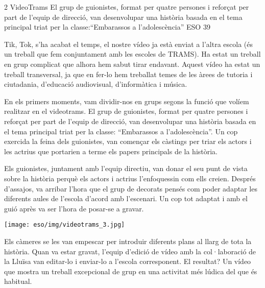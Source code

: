 \begin{news}
{2} %
{VideoTrams}
{El grup de guionistes, format per quatre persones i reforçat per part de l'equip de direcció, van desenvolupar una història basada en el tema principal triat per la classe:“Embarassos a l'adolescència” }
{ESO}
{39} %


Tik, Tok, s'ha acabat el temps, el nostre vídeo ja està enviat a l'altra escola (és un treball que fem conjuntament amb les escoles de TRAMS). Ha estat un treball en grup complicat que alhora hem sabut tirar endavant. Aquest vídeo ha estat un treball transversal, ja que en fer-lo  hem treballat temes de les àrees de tutoria i ciutadania, d'educació audiovisual, d'informàtica i música. 

En els primers moments,  vam dividir-nos en grups segons la funció que volíem realitzar en el videotrams. El grup de guionistes, format per quatre persones i reforçat per part de l'equip de direcció, van desenvolupar una història basada en el tema principal triat per la classe: “Embarassos a l'adolescència”. Un cop exercida la feina dels guionistes, van començar els càstings per triar els actors i les actrius que portarien a terme els papers principals de la història.



Els guionistes, juntament amb l'equip directiu,  van donar el seu punt de vista sobre la història perquè els actors i actrius l'enfoquessin com ells creien. Després d'assajos, va arribar l'hora que el grup de decorats pensés com poder adaptar les diferents aules de l'escola d'acord amb l'escenari. Un cop tot adaptat i amb el guió après va ser l'hora de posar-se a gravar. 

\noindent\texttt{[image: eso/img/videotrams\_3.jpg]}

Els càmeres se les van empescar per introduir diferents plans  al llarg de tota la història.  Quan va estar gravat, l'equip d'edició de vídeo amb la col·laboració de la Lluïsa  van editar-lo i enviar-lo a l'escola corresponent. El resultat? Un vídeo que mostra un treball excepcional de grup en una activitat més lúdica  del que és habitual.


\end{news}

\newssep

